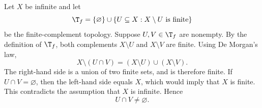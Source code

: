 
Let $X$ be infinite and let
\[ \T_f=\{\varnothing\}\cup\{U\subseteq X : X\setminus U \text{ is finite}\} \]
be the finite-complement topology. Suppose $U,V\in\T_f$ are nonempty. By the definition of
$\T_f$, both complements $X\setminus U$ and $X\setminus V$ are finite. Using De Morgan's law,
\[ X\setminus(U\cap V)=(X\setminus U)\cup(X\setminus V). \]
The right-hand side is a union of two finite sets, and is therefore finite. If
$U\cap V=\varnothing$, then the left-hand side equals $X$, which would imply that $X$ is finite.
This contradicts the assumption that $X$ is infinite. Hence
\[ \boxed{U\cap V\neq\varnothing.} \]
